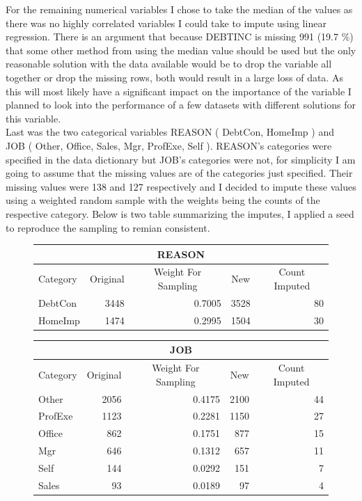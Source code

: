 For the remaining numerical variables I chose to take the median of the values as there was no highly correlated variables I could take to impute using linear regression. There is an argument that because DEBTINC is missing 991 (19.7 \%) that some other method from using the median value should be used but the only reasonable solution with the data available would be to drop the variable all together or drop the missing rows, both would result in a large loss of data. As this will most likely have a significant impact on the importance of the variable I planned to look into the performance of a few datasets with different solutions for this variable. \\

Last was the two categorical variables REASON ( DebtCon, HomeImp ) and JOB ( Other, Office, Sales, Mgr, ProfExe, Self ). REASON's categories were specified in the data dictionary but JOB's categories were not, for simplicity I am going to assume that the missing values are of the categories just specified. Their missing values were 138 and 127 respectively and I decided to impute these values using a weighted random sample with the weights being the counts of the respective category. Below is two table summarizing the imputes, I applied a seed to reproduce the sampling to remian consistent. 

\begin{figure}[ht]\label{REASON_IMPUTES}
	\centering
	\renewcommand{\arraystretch}{1.25}
	\begin{tabular}{lrrrr}
	\multicolumn{5}{c}{REASON}\\
	\hline
	Category & \multicolumn{1}{c}{Original} & \multicolumn{1}{c}{Weight For Sampling} & \multicolumn{1}{c}{New} & \multicolumn{1}{c}{Count Imputed} \\ 
	\hline
	DebtCon & 3448 & 0.7005 & 3528 & 80\\
	HomeImp & 1474 & 0.2995 & 1504  & 30\\
	\end{tabular}
\end{figure}

\begin{figure}[ht]\label{JOB_IMPUTES}
	\centering
	\renewcommand{\arraystretch}{1.25}
	\begin{tabular}{lrrrr}
	\multicolumn{5}{c}{JOB}\\
	\hline
	Category & \multicolumn{1}{c}{Original} & \multicolumn{1}{c}{Weight For Sampling} & \multicolumn{1}{c}{New} & \multicolumn{1}{c}{Count Imputed} \\ 
	\hline
	Other & 2056 & 0.4175 & 2100 & 44 \\
	ProfExe & 1123 & 0.2281 & 1150 & 27 \\
	Office & 862 & 0.1751 & 877 & 15 \\
	Mgr & 646 & 0.1312 & 657  & 11 \\
	Self & 144 & 0.0292 & 151  & 7 \\
	Sales & 93 & 0.0189 & 97 & 4 \\
	\end{tabular}
\end{figure}

